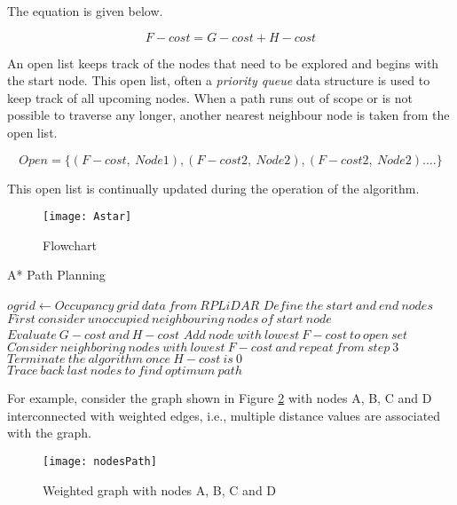 The equation is given below.

\[F-cost = G-cost + H-cost\]

An open list keeps track of the nodes that need to be explored and begins with the start node. This open list, often a \emph{priority queue} data structure is used to keep track of all upcoming nodes. When a path runs out of scope or is not possible to traverse any longer, another nearest neighbour node is taken from the open list.

\[Open = \{(F-cost, \ Node1),(F-cost2, \ Node2), (F-cost2, \ Node2) .... \}\]

This open list is continually updated during the operation of the algorithm.

\newpage
\begin{figure}
    \centering
    \texttt{[image: Astar]}
    \caption{Flowchart}
    \label{fig:pathPlanningFlowchart}
\end{figure}

\vspace{2cm}
\begin{algorithm}[hbt!]
    \caption{A* Path Planning}
    \label{alg:AStarAlgorithm}
    
    \begin{algorithmic}[1]
    
        \Require $ogrid \gets Occupancy \ grid \ data \ from \ RPLiDAR$
        \State $Define \ the \ start \ and \ end\ nodes$
        \State $First \ consider \ unoccupied \ neighbouring \ nodes \ of \ start \ node$
        \State $Evaluate \ G-cost \ and \ H-cost$
        \State $Add \ node \ with \ lowest \ F-cost \ to \ open \ set$
        \State $Consider \ neighboring \ nodes \ with \ lowest \ F-cost \ and \ repeat \ from \ step \ 3 $
        \State $Terminate \ the \ algorithm \ once \ H-cost \ is \ 0 $
        \State $Trace \ back \ last \ nodes\ to \ find \ optimum \ path$
        
    \end{algorithmic}
\end{algorithm}

For example, consider the graph shown in Figure \ref{fig:weightedGraph} with nodes A, B, C and D interconnected with weighted edges, i.e., multiple distance values are associated with the graph.

\begin{figure}[hbt!]
    \centering
    \texttt{[image: nodesPath]}
    \caption{Weighted graph with nodes A, B, C and D}
    \label{fig:weightedGraph}
\end{figure}

